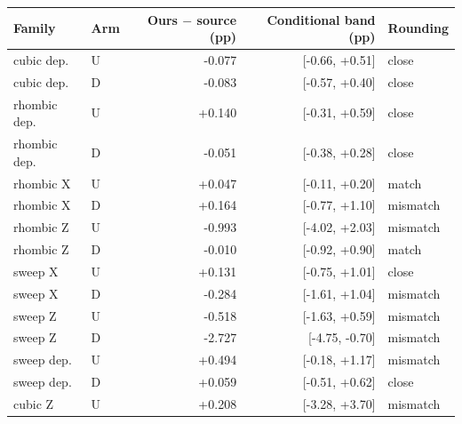 \begin{longtable}{llrrl}
\toprule Family & Arm & Ours $-$ source (pp) & Conditional band (pp) & Rounding\\\midrule\endhead
cubic dep. & U & -0.077 & [-0.66, +0.51] & close\\
cubic dep. & D & -0.083 & [-0.57, +0.40] & close\\
rhombic dep. & U & +0.140 & [-0.31, +0.59] & close\\
rhombic dep. & D & -0.051 & [-0.38, +0.28] & close\\
rhombic X & U & +0.047 & [-0.11, +0.20] & match\\
rhombic X & D & +0.164 & [-0.77, +1.10] & mismatch\\
rhombic Z & U & -0.993 & [-4.02, +2.03] & mismatch\\
rhombic Z & D & -0.010 & [-0.92, +0.90] & match\\
sweep X & U & +0.131 & [-0.75, +1.01] & close\\
sweep X & D & -0.284 & [-1.61, +1.04] & mismatch\\
sweep Z & U & -0.518 & [-1.63, +0.59] & mismatch\\
sweep Z & D & -2.727 & [-4.75, -0.70] & mismatch\\
sweep dep. & U & +0.494 & [-0.18, +1.17] & mismatch\\
sweep dep. & D & +0.059 & [-0.51, +0.62] & close\\
cubic Z & U & +0.208 & [-3.28, +3.70] & mismatch\\
\bottomrule\end{longtable}
